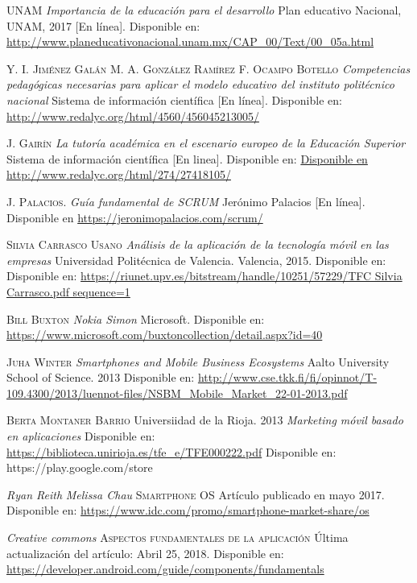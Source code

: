 \begin{thebibliography}{X}
		\textsc{UNAM}
		\textit{Importancia de la educación para el desarrollo} Plan educativo Nacional, UNAM, 2017
		[En línea]. Disponible en: 
		\url{http://www.planeducativonacional.unam.mx/CAP_00/Text/00_05a.html}
		
		\textsc{Y. I. Jiménez Galán}
		\textsc{M. A. González Ramírez}
		\textsc{F. Ocampo Botello}
		\textit{Competencias pedagógicas necesarias para aplicar el modelo educativo del instituto
		politécnico nacional} Sistema de información científica [En línea]. 
		Disponible en: \url{http://www.redalyc.org/html/4560/456045213005/}		

		\textsc{J. Gairín}
		\textit{La tutoría académica en el escenario europeo de la Educación Superior} Sistema de
		información científica [En linea]. 
		Disponible en: \url{Disponible en http://www.redalyc.org/html/274/27418105/}

		\textsc{J. Palacios.}
		\textit{Guía fundamental de SCRUM} Jerónimo Palacios [En línea]. 
		Disponible en \url{https://jeronimopalacios.com/scrum/}

		\textsc{Silvia Carrasco Usano}
		\textit{Análisis de la aplicación de la tecnología móvil en las empresas} Universidad 
		Politécnica de Valencia. Valencia, 2015. Disponible en:
		Disponible en: \url{https://riunet.upv.es/bitstream/handle/10251/57229/TFC Silvia Carrasco.pdf
		sequence=1}
	
		\textsc{Bill Buxton}
		\textit{Nokia Simon} Microsoft.
		Disponible en: \url{https://www.microsoft.com/buxtoncollection/detail.aspx?id=40}
		
		\textsc{Juha Winter}
		\textit{Smartphones and Mobile Business Ecosystems } Aalto University School of Science. 2013
		Disponible en: \url{http://www.cse.tkk.fi/fi/opinnot/T-109.4300/2013/luennot-files/NSBM_Mobile_Market_22-01-2013.pdf}
		
		\textsc{Berta Montaner Barrio} Universiidad de la Rioja. 2013
		\textit{Marketing móvil basado en aplicaciones} Disponible en: 
		\url{https://biblioteca.unirioja.es/tfe_e/TFE000222.pdf}
		Disponible en: https://play.google.com/store
	
		\textit{Ryan Reith}
		\textit{Melissa Chau}
		\textsc{Smartphone OS} Artículo publicado en mayo 2017.
		Disponible en: \url{https://www.idc.com/promo/smartphone-market-share/os}
	
		\textit{Creative commons}
		\textsc{Aspectos fundamentales de la aplicación} Última actualización del artículo: Abril 25, 2018. 
		Disponible en: \url{https://developer.android.com/guide/components/fundamentals}	
		

\end{thebibliography}
